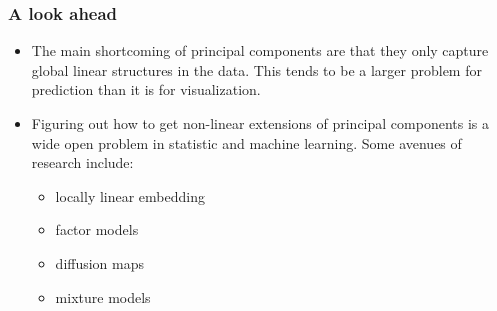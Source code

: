 \begin{frame}[fragile] \frametitle{A look ahead} 

\begin{itemize}
\item The main shortcoming of principal components are that they only
capture global linear structures in the data. This tends to be
a larger problem for prediction than it is for visualization.

\item Figuring out how to get non-linear extensions of principal
components is a wide open problem in statistic and machine learning.
Some avenues of research include:
\begin{itemize}
\item locally linear embedding
\item factor models
\item diffusion maps
\item mixture models
\end{itemize}
\end{itemize}


\end{frame}

